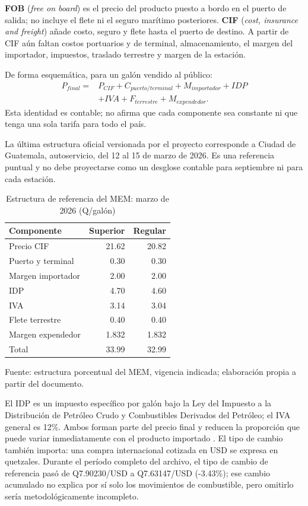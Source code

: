 \documentclass[11pt,letterpaper]{article}
\begin{document}
\textbf{FOB} (\emph{free on board}) es el precio del producto puesto a bordo en el puerto de salida; no incluye el flete ni el seguro marítimo posteriores. \textbf{CIF} (\emph{cost, insurance and freight}) añade costo, seguro y flete hasta el puerto de destino. A partir de CIF aún faltan costos portuarios y de terminal, almacenamiento, el margen del importador, impuestos, traslado terrestre y margen de la estación.

De forma esquemática, para un galón vendido al público:
\begin{align}
 P_{final}={}&P_{CIF}+C_{puerto/terminal}+M_{importador}+IDP\\
 &+IVA+F_{terrestre}+M_{expendedor}.
\end{align}
Esta identidad es contable; no afirma que cada componente sea constante ni que tenga una sola tarifa para todo el país.

La última estructura oficial versionada por el proyecto corresponde a Ciudad de Guatemala, autoservicio, del 12 al 15 de marzo de 2026. Es una referencia puntual y no debe proyectarse como un desglose contable para septiembre ni para cada estación.

\begin{table}[htbp]
\centering
\caption{Estructura de referencia del MEM: marzo de 2026 (Q/galón)}
\label{tab:estructura}
\begin{tabular}{lrr}
\toprule
Componente & Superior & Regular \\
\midrule
Precio CIF & 21.62 & 20.82 \\
Puerto y terminal & 0.30 & 0.30 \\
Margen importador & 2.00 & 2.00 \\
IDP & 4.70 & 4.60 \\
IVA & 3.14 & 3.04 \\
Flete terrestre & 0.40 & 0.40 \\
Margen expendedor & 1.832 & 1.832 \\
\midrule
Total & 33.99 & 32.99 \\
\bottomrule
\end{tabular}
\par\smallskip\footnotesize Fuente: estructura porcentual del MEM, vigencia indicada; elaboración propia a partir del documento. \parencite{memEstructura2026}
\end{table}

El IDP es un impuesto específico por galón bajo la Ley del Impuesto a la Distribución de Petróleo Crudo y Combustibles Derivados del Petróleo; el IVA general es 12\%. Ambos forman parte del precio final y reducen la proporción que puede variar inmediatamente con el producto importado \parencite{congresoIDP1998,congresoIVA1992}. El tipo de cambio también importa: una compra internacional cotizada en USD se expresa en quetzales. Durante el período completo del archivo, el tipo de cambio de referencia pasó de Q7.90230/USD a Q7.63147/USD (-3.43\%); ese cambio acumulado no explica por sí solo los movimientos de combustible, pero omitirlo sería metodológicamente incompleto.
\end{document}
